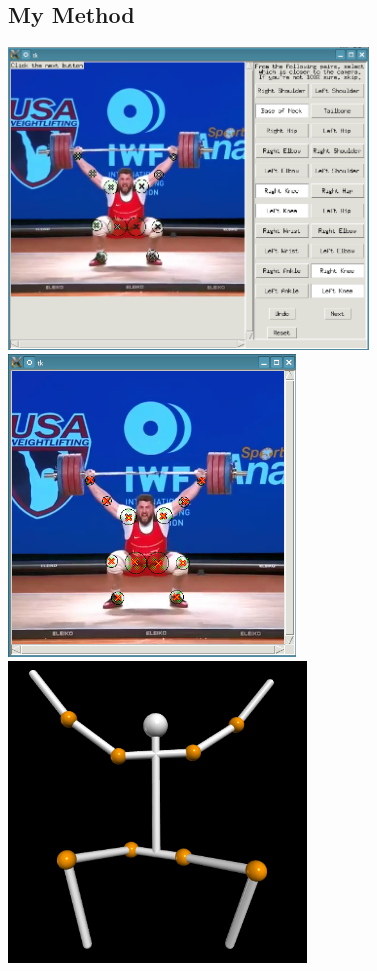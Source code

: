 \documentclass[final]{article}
\begin{document}
\begin{spacing}{1.1}
\subsection{My Method}
\begin{center}
  \includegraphics[height=8cm]{fig/myjerk.png}
  \includegraphics[height=8cm]{fig/myjerkopt.png} \\
  \includegraphics[height=8cm]{fig/myjerkrecons.png}

\end{center}
\end{spacing}
\end{document}
